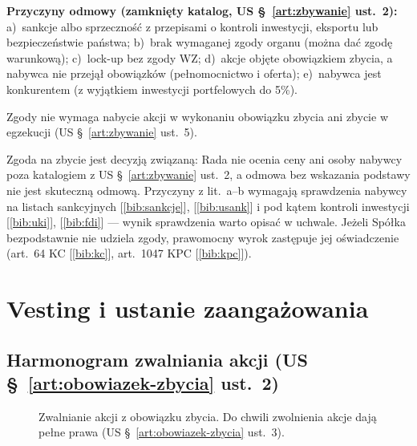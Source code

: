 \documentclass[11pt,a4paper]{report}
\newcommand{\Zr}[1]{[\ref{bib:#1}]}
\begin{document}
\textbf{Przyczyny odmowy (zamknięty katalog, US §~\ref{art:zbywanie} ust.~2):} a)~sankcje albo sprzeczność z przepisami o kontroli inwestycji, eksportu lub bezpieczeństwie państwa; b)~brak wymaganej zgody organu (można dać zgodę warunkową); c)~lock-up bez zgody WZ; d)~akcje objęte obowiązkiem zbycia, a nabywca nie przejął obowiązków (pełnomocnictwo i oferta); e)~nabywca jest konkurentem (z wyjątkiem inwestycji portfelowych do 5\%).

Zgody nie wymaga nabycie akcji w wykonaniu obowiązku zbycia ani zbycie w egzekucji (US §~\ref{art:zbywanie} ust.~5).

\begin{Komentarz}
Zgoda na zbycie jest decyzją związaną: Rada nie ocenia ceny ani osoby nabywcy poza katalogiem z US §~\ref{art:zbywanie} ust.~2, a odmowa bez wskazania podstawy nie jest skuteczną odmową. Przyczyny z lit.~a--b wymagają sprawdzenia nabywcy na listach sankcyjnych \Zr{sankcje}, \Zr{usank} i pod kątem kontroli inwestycji \Zr{uki}, \Zr{fdi} --- wynik sprawdzenia warto opisać w uchwale. Jeżeli Spółka bezpodstawnie nie udziela zgody, prawomocny wyrok zastępuje jej oświadczenie (art.~64 KC \Zr{kc}, art.~1047 KPC \Zr{kpc}).
\end{Komentarz}

\section{Vesting i ustanie zaangażowania}

\subsection*{Harmonogram zwalniania akcji (US §~\ref{art:obowiazek-zbycia} ust.~2)}

\begin{figure}[H]
\centering
{}
\caption{Zwalnianie akcji z obowiązku zbycia. Do chwili zwolnienia akcje dają pełne prawa (US §~\ref{art:obowiazek-zbycia} ust.~3).}
\end{figure}
\end{document}
